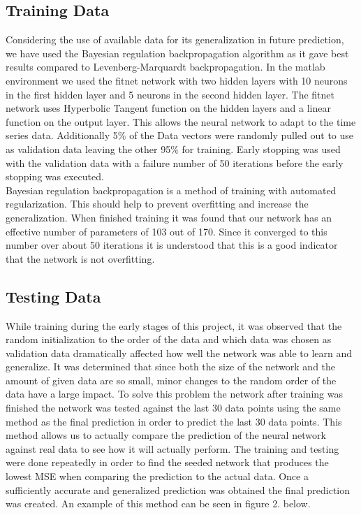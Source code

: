 \documentclass[conference]{IEEEtran}
\begin{document}
\subsection{Training Data}
Considering the use of available data for its generalization in future prediction, we have used the Bayesian regulation backpropagation algorithm as it gave best results compared to Levenberg-Marquardt backpropagation. In the matlab environment we used the fitnet network with two hidden layers with 10 neurons in the first hidden layer and 5 neurons in the second hidden layer. The fitnet network uses Hyperbolic Tangent function on the hidden layers and a linear function on the output layer. This allows the neural network to adapt to the time series data. Additionally 5\% of the Data vectors were randomly pulled out to use as validation data leaving the other 95\% for training. Early stopping was used with the validation data with a failure number of 50 iterations before the early stopping was executed.\\

Bayesian regulation backpropagation is a method of training with automated regularization. This should help to prevent overfitting and increase the generalization. When finished training it was found that our network has an effective number of parameters of 103 out of 170. Since it converged to this number over about 50 iterations it is understood that this is a good indicator that the network is not overfitting. 

\subsection{Testing Data}
While training during the early stages of this project, it was observed that the random initialization to the order of the data and which data was chosen as validation data dramatically affected how well the network was able to learn and generalize. It was determined that since both the size of the network and the amount of given data are so small, minor changes to the random order of the data have a large impact. To solve this problem the network after training was finished the network was tested against the last 30 data points using the same method as the final prediction in order to predict the last 30 data points. This method allows us to actually compare the prediction of the neural network against real data to see how it will actually perform. The training and testing were done repeatedly in order to find the seeded network that produces the lowest MSE when comparing the prediction to the actual data. Once a sufficiently accurate and generalized prediction was obtained the final prediction was created. An example of this method can be seen in figure 2. below. \\
\end{document}
